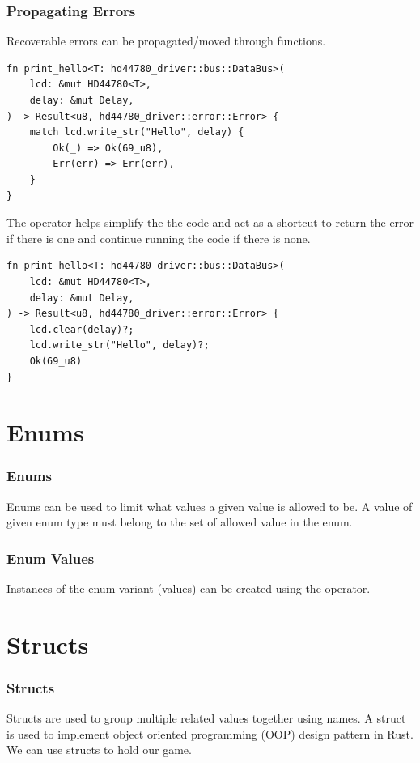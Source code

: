 \documentclass{beamer}
\begin{document}
\begin{frame}
  \frametitle{Propagating Errors}
  Recoverable errors can be propagated/moved through functions.

\begin{lstlisting}
fn print_hello<T: hd44780_driver::bus::DataBus>(
    lcd: &mut HD44780<T>,
    delay: &mut Delay,
) -> Result<u8, hd44780_driver::error::Error> {
    match lcd.write_str("Hello", delay) {
        Ok(_) => Ok(69_u8),
        Err(err) => Err(err),
    }
}
\end{lstlisting}

  \pagebreak

  The  operator helps simplify the the code and act as a shortcut to return the error if there is one and continue running the code if there is none.

\begin{lstlisting}
fn print_hello<T: hd44780_driver::bus::DataBus>(
    lcd: &mut HD44780<T>,
    delay: &mut Delay,
) -> Result<u8, hd44780_driver::error::Error> {
    lcd.clear(delay)?;
    lcd.write_str("Hello", delay)?;
    Ok(69_u8)
}
\end{lstlisting}
\end{frame}

\section{Enums}
\begin{frame}[fragile]
  \frametitle{Enums}
  Enums can be used to limit what values a given value is allowed to be. A value of given enum type must belong to the set of allowed value in the enum.

  
\end{frame}

\begin{frame}[fragile]
  \frametitle{Enum Values}
  Instances of the enum variant (values) can be created using the \inlinecode{::} operator.

  
\end{frame}

\section{Structs}
\begin{frame}
  \frametitle{Structs}
  Structs are used to group multiple related values together using names. A struct is used to implement object oriented programming (OOP) design pattern in Rust. We can use structs to hold our game.
  
\end{frame}
\end{document}
